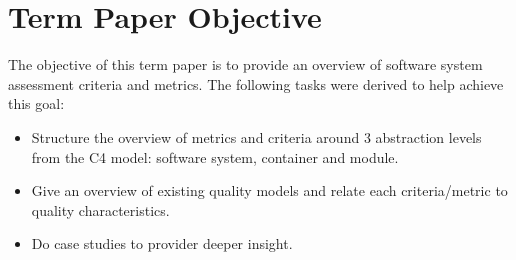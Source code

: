 \documentclass[12pt]{article}
\begin{document}
\section{Term Paper Objective}
The objective of this term paper is to provide an overview of software system assessment criteria and metrics. The following tasks were derived to help achieve this goal:
\begin{itemize}
    \item Structure the overview of metrics and criteria around 3 abstraction levels from the C4 model: software system, container and module.
    \item Give an overview of existing quality models and relate each criteria/metric to quality characteristics.
    \item Do case studies to provider deeper insight.
\end{itemize}

\newpage %


\end{document}
